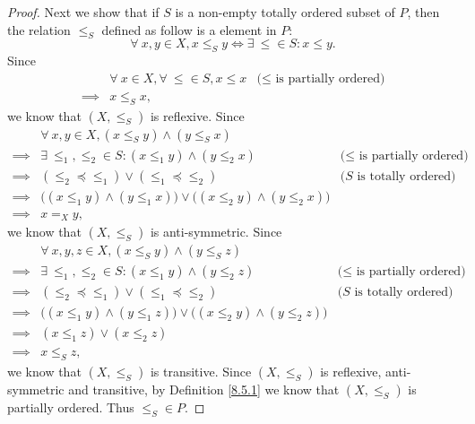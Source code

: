 \begin{proof}
    Next we show that if \(S\) is a non-empty totally ordered subset of \(P\), then the relation \(\leq_S\) defined as follow is a element in \(P\):
    \[
        \forall\ x, y \in X, x \leq_S y \iff \exists\ \leq \in S : x \leq y.
    \]
    Since
    \begin{align*}
                 & \forall\ x \in X, \forall\ \leq \in S, x \leq x & \text{(\(\leq\) is partially ordered)} \\
        \implies & x \leq_S x,
    \end{align*}
    we know that \((X, \leq_S)\) is reflexive.
    Since
    \begin{align*}
                 & \forall\ x, y \in X, (x \leq_S y) \land (y \leq_S x)                                                                              \\
        \implies & \exists\ \leq_1, \leq_2 \in S : (x \leq_1 y) \land (y \leq_2 x)                          & \text{(\(\leq\) is partially ordered)} \\
        \implies & (\leq_2 \preceq \leq_1) \lor (\leq_1 \preceq \leq_2)                                     & \text{(\(S\) is totally ordered)}      \\
        \implies & \big((x \leq_1 y) \land (y \leq_1 x)\big) \lor \big((x \leq_2 y) \land (y \leq_2 x)\big)                                          \\
        \implies & x =_X y,
    \end{align*}
    we know that \((X, \leq_S)\) is anti-symmetric.
    Since
    \begin{align*}
                 & \forall\ x, y, z \in X, (x \leq_S y) \land (y \leq_S z)                                                                           \\
        \implies & \exists\ \leq_1, \leq_2 \in S : (x \leq_1 y) \land (y \leq_2 z)                          & \text{(\(\leq\) is partially ordered)} \\
        \implies & (\leq_2 \preceq \leq_1) \lor (\leq_1 \preceq \leq_2)                                     & \text{(\(S\) is totally ordered)}      \\
        \implies & \big((x \leq_1 y) \land (y \leq_1 z)\big) \lor \big((x \leq_2 y) \land (y \leq_2 z)\big)                                          \\
        \implies & (x \leq_1 z) \lor (x \leq_2 z)                                                                                                    \\
        \implies & x \leq_S z,
    \end{align*}
    we know that \((X, \leq_S)\) is transitive.
    Since \((X, \leq_S)\) is reflexive, anti-symmetric and transitive, by Definition \ref{8.5.1} we know that \((X, \leq_S)\) is partially ordered.
    Thus \(\leq_S \in P\).


\end{proof}
